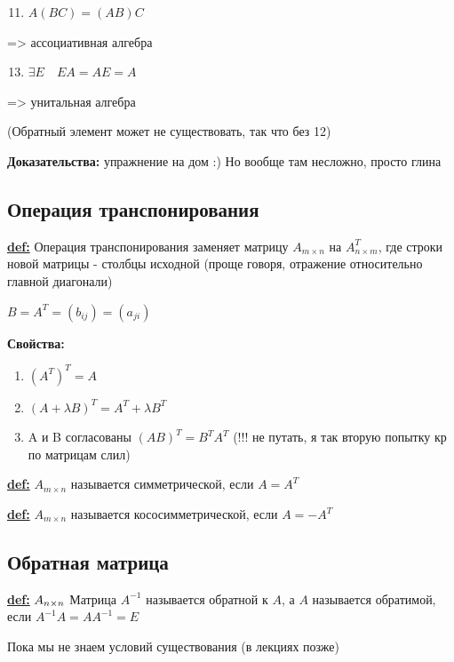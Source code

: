 \documentclass[twoside]{book}
\begin{document}
\begin{enumerate}
    \setcounter{enumi}{10}
    \item $ A(BC) = (AB)C$
\end{enumerate} => ассоциативная алгебра

\begin{enumerate}
    \setcounter{enumi}{12}
    \item $ \exists E \quad EA=AE=A$
\end{enumerate} => унитальная алгебра

(Обратный элемент может не существовать, так что без 12)

\textbf{Доказательства:} упражнение на дом :) Но вообще там несложно, просто глина


\subsection{Операция транспонирования}

\textbf{\underline{def:}} Операция транспонирования заменяет матрицу $ A_{m \times n} $ на $ A^T_{n \times m} $, где строки новой матрицы - столбцы исходной (проще говоря, отражение относительно главной диагонали)

\( B = A^T = (b_{ij}) = (a_{ji}) \)

\textbf{Свойства:}
\begin{enumerate}
    \item $ (A^T)^T = A $
    \item $ (A+\lambda B)^T = A^T+\lambda B^T $
    \item A и B согласованы $ (AB)^T = B^T A^T $ (!!! не путать, я так вторую попытку кр по матрицам слил)
\end{enumerate}

\textbf{\underline{def:}} $ A_{m \times n} $ называется симметрической, если $ A = A^T$

\textbf{\underline{def:}} $ A_{m \times n} $ называется кососимметрической, если $ A = -A^T$

\subsection{Обратная матрица}

\textbf{\underline{def:}}
\( A_{n \times n} \newline\)
Матрица $ A^{-1} $ называется обратной к $ A $, а $ A $ называется обратимой, если $ A^{-1}A = AA^{-1} = E $

Пока мы не знаем условий существования (в лекциях позже)
\end{document}

